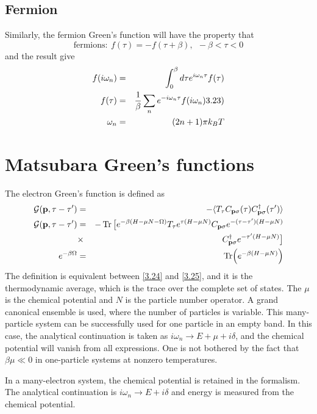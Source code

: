 \subsection{Fermion}
Similarly, the fermion Green's function will have the property that
\begin{equation}
  \label{3.21}
  \mathrm{fermions:}~ f(\tau) = - f(\tau+ \beta),~ ~ -\beta<\tau<0
\end{equation}
and the result give
\begin{eqnarray}
  f(i\omega_n)&=&\int_0^\beta d\tau e^{i\omega_n\tau}f(\tau) \nonumber \\
  f(\tau)&=&\frac{1}{\beta}\sum_n e^{-i\omega_n\tau}f(i\omega_n) \label(3.23) \\
  \omega_n &=&(2n+1)\pi k_B T \nonumber
\end{eqnarray}

\section{Matsubara Green's functions}\label{s3.2}
The electron Green's function is defined as
\begin{eqnarray}
  \mathcal{G}(\mathbf{p},\tau-\tau') &=& - \langle T_\tau C_{\mathbf{p}\sigma}(\tau)C^\dagger_{\mathbf{p}\sigma}(\tau') \rangle  \label{3.24} \\
  \mathcal{G}(\mathbf{p},\tau-\tau')&=& -\Tr \big[e^{-\beta(H-\mu N -\Omega)} T_\tau e^{\tau(H-\mu N)} C_{\mathbf{p}\sigma}e^{-(\tau-\tau')(H-\mu N)} \nonumber \\
  &\times& C^\dagger_{\mathbf{p}\sigma} e^{-\tau'(H-\mu N)} \big] \label{3.25} \\
  e^{-\beta \Omega} &=& \Tr(e^{-\beta(H-\mu N)}) \label{3.26}
\end{eqnarray}
The definition is equivalent between \eqref{3.24} and \eqref{3.25}, and it is the thermodynamic average, which is the trace over the complete set of states.
The $\mu$ is the chemical potential and $N$ is the particle number operator.
A grand canonical ensemble is used, where the number of particles is variable.
This many-particle system can be successfully used for one particle in an empty band.
In this case, the analytical continuation is taken as $i\omega_n \to E+ \mu + i\delta$, and the chemical potential will vanish from all expressions.
One is not bothered by the fact that $\beta \mu \ll 0$ in one-particle systems at nonzero temperatures.

In a many-electron system, the chemical potential is retained in the formalism.
The analytical continuation is $i\omega_n \to E+ i\delta$ and energy is measured from the chemical potential.

